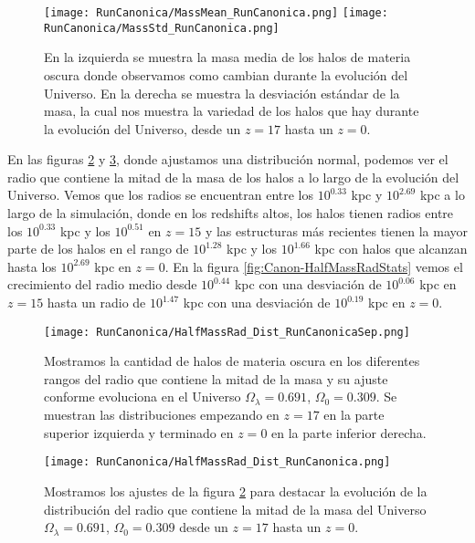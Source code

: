 \begin{figure}[H]
    \centering
    \texttt{[image: RunCanonica/MassMean\_RunCanonica.png]}
    \texttt{[image: RunCanonica/MassStd\_RunCanonica.png]}
    \caption[Media y desviación estándar de la distribución de masa]{\footnotesize En la izquierda se muestra la masa media de los halos de materia oscura donde observamos como cambian durante la evolución del Universo. En la derecha se muestra la desviación estándar de la masa, la cual nos muestra la variedad de los halos que hay durante la evolución del Universo, desde un $z=17$ hasta un $z=0$.}
    \label{fig:Canon-MassStats}
\end{figure}

En las figuras \ref{fig:Canon-HalfMassRadDistSep} y \ref{fig:Canon-HalfMassRadDist}, donde ajustamos una distribución normal, podemos ver el radio que contiene la mitad de la masa de los halos a lo largo de la evolución del Universo. Vemos que los radios se encuentran entre los $10^{0.33}$ kpc y $10^{2.69}$ kpc a lo largo de la simulación, donde en los redshifts altos, los halos tienen radios entre los $10^{0.33}$ kpc y los $10^{0.51}$ en $z=15$ y las estructuras más recientes tienen la mayor parte de los halos en el rango de $10^{1.28}$ kpc y los $10^{1.66}$ kpc con halos que alcanzan hasta los $10^{2.69}$ kpc en $z=0$. En la figura \ref{fig:Canon-HalfMassRadStats} vemos el crecimiento del radio medio desde $10^{0.44}$ kpc con una desviación de $10^{0.06}$ kpc en $z=15$ hasta un radio de $10^{1.47}$ kpc con una desviación de $10^{0.19}$ kpc en $z=0$.

\begin{figure}[H]
    \centering
    \texttt{[image: RunCanonica/HalfMassRad\_Dist\_RunCanonicaSep.png]}
    \caption[Radio que contiene la mitad de la masa]{\footnotesize Mostramos la cantidad de halos de materia oscura en los diferentes rangos del radio que contiene la mitad de la masa y su ajuste conforme evoluciona en el Universo $\Omega_\lambda = 0.691 $, $\Omega_0 = 0.309$. Se muestran las distribuciones empezando en $z=17$ en la parte superior izquierda y terminado en $z=0$ en la parte inferior derecha.} 
    \label{fig:Canon-HalfMassRadDistSep}
\end{figure}

\begin{figure}[H]
    \centering
    \texttt{[image: RunCanonica/HalfMassRad\_Dist\_RunCanonica.png]}
    \caption[Distribución del radio que contiene la mitad de la masa]{\footnotesize Mostramos los ajustes de la figura \ref{fig:Canon-HalfMassRadDistSep} para destacar la evolución de la distribución del radio que contiene la mitad de la masa del Universo $\Omega_\lambda = 0.691 $, $\Omega_0 = 0.309$ desde un $z=17$ hasta un $z=0$.}
    \label{fig:Canon-HalfMassRadDist}
\end{figure}

